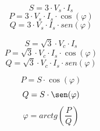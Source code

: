 \documentclass[../main]{subfiles}
\begin{document}
\begin{equation}
  S= 3 \cdot  V_s \cdot I_s
\end{equation}
\begin{equation}
  P= 3 \cdot  V_s \cdot I_s \cdot \cos(\varphi)
\end{equation}
\begin{equation}
  Q= 3 \cdot  V_s \cdot I_s \cdot sen(\varphi)
\end{equation}

\begin{equation}
  S= \sqrt{3} \cdot  V_c  \cdot I_s
\end{equation}
\begin{equation}
  P= \sqrt{3} \cdot  V_c  \cdot I_s \cdot \cos(\varphi)
\end{equation}
\begin{equation}
  Q= \sqrt{3} \cdot  V_c  \cdot I_s \cdot sen(\varphi)
\end{equation}

\begin{equation}
  P= S \cdot \cos(\varphi)
\end{equation}
\begin{equation}
  Q= S \cdot \sen(\varphi)
\end{equation}
\begin{equation}
  \varphi=arctg({\frac{P}{Q}})
\end{equation}
\end{document}
